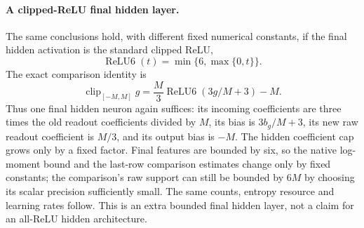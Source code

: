 \paragraph{A clipped-ReLU final hidden layer.}
The same conclusions hold, with different fixed numerical constants,
if the final hidden activation is the standard clipped ReLU,
\[
 \operatorname{ReLU6}(t)=\min\{6,\max\{0,t\}\}.
\]
The exact comparison identity is
\[
 \operatorname{clip}_{[-M,M]}g
   =\frac M3\operatorname{ReLU6}(3g/M+3)-M.
\]
Thus one final hidden neuron again suffices: its incoming coefficients
are three times the old readout coefficients divided by $M$, its bias
is $3b_g/M+3$, its new raw readout coefficient is $M/3$, and its
output bias is $-M$. The hidden coefficient cap grows only by a fixed
factor. Final features are bounded by six, so the native log-moment
bound and the last-row comparison estimates change only by fixed
constants; the comparison's raw support can still be bounded by $6M$
by choosing its scalar precision sufficiently small. The same counts,
entropy resource and learning rates follow. This is an extra bounded
final hidden layer, not a claim for an all-ReLU hidden architecture.

